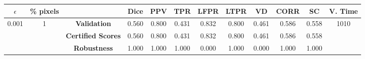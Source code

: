 \begin{longtable}{ c  c | c | c  c  c  c  c  c  c c c}
\toprule \textbf{$\epsilon$} & \textbf{\% pixels} & & \textbf{Dice} & \textbf{PPV} & \textbf{TPR} & \textbf{LFPR} & \textbf{LTPR} & \textbf{VD} & \textbf{CORR} & \textbf{SC} & \textbf{V. Time} \\
\midrule 
\multirow{3}{*}{0.001}  & \multirow{3}{*}{1} &\textbf{Validation} & 0.560 & 0.800 & 0.431 & 0.832 & 0.800 & 0.461 & 0.586 & 0.558 & \multirow{3}{*}{1010} \\
 & & \textbf{Certified Scores} & 0.560 & 0.800 & 0.431 & 0.832 & 0.800 & 0.461 & 0.586 & 0.558 & \\
& & \textbf{Robustness} & 1.000 & 1.000 & 1.000 & 0.000 & 1.000 & 0.000 & 1.000 & 1.000 & \\
\end{longtable}